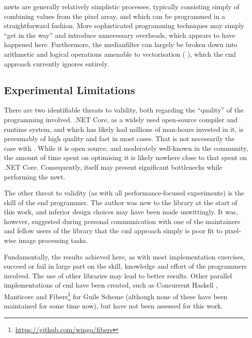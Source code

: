 \Glspl{mwt} are generally relatively simplistic processes, typically consisting simply of combining values from the pixel array, and which can be programmed in a straightforward fashion.  More sophisticated programming techniques may simply ``get in the way'' and introduce unnecessary overheads, which appears to have happened here.  Furthermore, the \gls{medianfilter} can largely be broken down into arithmetic and logical operations amenable to vectorisation (\eg{} \cite{Sanchez2012,Perreault2007}), which the \gls{cml} approach currently ignores entirely.

\subsection{Experimental Limitations}
There are two identifiable threats to validity, both regarding the ``quality'' of the programming involved.  .NET Core, as a widely used open-source compiler and runtime system, and which has likely had millions of man-hours invested in it, is presumably of high quality and fast in most cases.  That is not necessarily the case with \hopac{}.  While it is open source, and moderately well-known in the \fsharp{} community, the amount of time spent on optimising it is likely nowhere close to that spent on .NET Core.  Consequently, \hopac{} itself may present significant bottlenecks while performing the \gls{mwt}.

The other threat to validity (as with all performance-focused experiments) is the skill of the end programmer.  The author was new to the \hopac{} library at the start of this work, and inferior design choices may have been made unwittingly.  It was, however, suggested during personal communication with one of the maintainers and fellow users of the \hopac{} library that the \gls{cml} approach simply is poor fit to pixel-wise image processing tasks.

Fundamentally, the results achieved here, as with most implementation exercises, succeed or fail in large part on the skill, knowledge and effort of the programmers involved.  The use of other libraries may lead to better results.  Other parallel implementations of \gls{cml} have been created, such as Concurrent Haskell \cite{Chaudhuri2009}, Manticore \cite{Reppy2009a} and Fibers\footnote{\url{https://github.com/wingo/fibers}} for Guile Scheme (although none of these have been maintained for some time now), but have not been assessed for this work.
